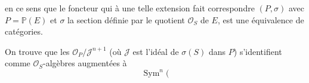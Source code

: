 
en ce sens que le  foncteur qui à une telle extension fait correspondre $(P,\sigma)$ avec $P=\mathbb{P}(E)$ et $\sigma$ la section définie par le quotient  $\mathcal{O}_S$ de $E$, est une équivalence de catégories.

On trouve que les $\mathcal{O}_P/\mathcal{J}^{n+1}$ (où $\mathcal{J}$ est l'idéal de $\sigma(S)$ dans $P$) s'identifient comme $\mathcal{O}_S$-algèbres augmentées à
\[
\operatorname{Sym}^n(
\]
